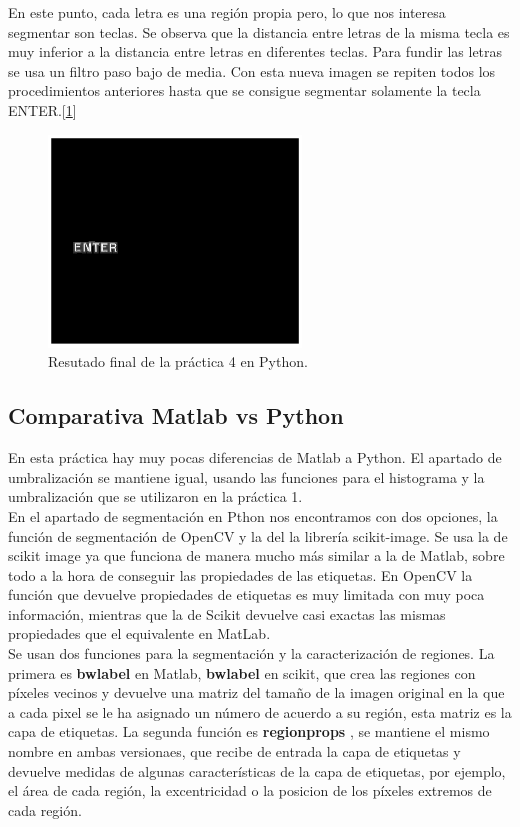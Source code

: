 \documentclass[a4paper,12pt]{report}
\begin{document}
En este punto, cada letra es una región propia pero, lo que nos interesa segmentar son teclas. Se observa que la distancia entre letras de la misma tecla es muy inferior a la distancia entre letras en diferentes teclas. Para fundir las letras se usa un filtro paso bajo de media. Con esta nueva imagen se repiten todos los procedimientos anteriores hasta que se consigue segmentar solamente la tecla ENTER.[\ref{finp4}]

\begin{figure}[h]
\centering
\includegraphics[width=0.6\textwidth]{imagenes/finp4}
\caption{Resutado final de la práctica 4 en Python.}
\label{finp4}
\end{figure}


\subsection{Comparativa Matlab vs Python}

En esta práctica hay muy pocas diferencias de Matlab a Python. El apartado de umbralización se mantiene igual, usando las funciones para el histograma y la umbralización que se utilizaron en la práctica 1.\\

En el apartado de segmentación en Pthon nos encontramos con dos opciones, la función de segmentación de OpenCV y la del la librería scikit-image. Se usa la de scikit image ya que funciona de manera mucho más similar a la de Matlab, sobre todo a la hora de conseguir las propiedades de las etiquetas. En OpenCV la función que devuelve propiedades de etiquetas es muy limitada con muy poca información, mientras que la de Scikit devuelve casi exactas las mismas propiedades que el equivalente en MatLab.\\


 Se usan dos funciones para la segmentación y la caracterización de regiones. La primera es \textbf{bwlabel} en Matlab, \textbf{bwlabel} en scikit,  que crea las regiones con píxeles vecinos y devuelve una matriz del tamaño de la imagen original en la que a cada pixel se le ha asignado un número de acuerdo a su región, esta matriz es la capa de etiquetas. La segunda función es \textbf{regionprops} , se mantiene el mismo nombre en ambas versionaes, que recibe de entrada la capa de etiquetas y devuelve medidas de algunas características de la capa de etiquetas, por ejemplo, el área de cada región, la excentricidad o la posicion de los píxeles extremos de cada región.\\
\end{document}
